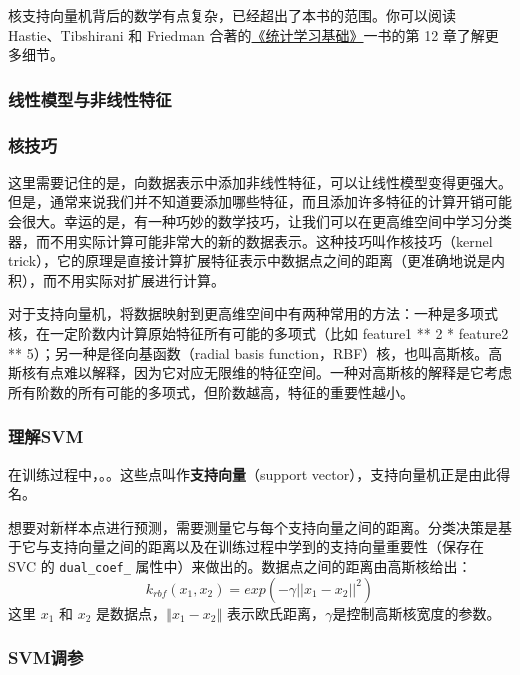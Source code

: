 核支持向量机背后的数学有点复杂，已经超出了本书的范围。你可以阅读 Hastie、Tibshirani 和 Friedman 合著的\href{https://hastie.su.domains/ElemStatLearn/}{《统计学习基础》}一书的第 12 章了解更多细节。
\subsubsection{线性模型与非线性特征}

\subsubsection{核技巧}
这里需要记住的是，向数据表示中添加非线性特征，可以让线性模型变得更强大。但是，通常来说我们并不知道要添加哪些特征，而且添加许多特征的计算开销可能会很大。幸运的是，有一种巧妙的数学技巧，让我们可以在更高维空间中学习分类器，而不用实际计算可能非常大的新的数据表示。这种技巧叫作核技巧（kernel trick），它的原理是直接计算扩展特征表示中数据点之间的距离（更准确地说是内积），而不用实际对扩展进行计算。

对于支持向量机，将数据映射到更高维空间中有两种常用的方法：一种是多项式核，在一定阶数内计算原始特征所有可能的多项式（比如 feature1 ** 2 * feature2 ** 5）；另一种是径向基函数（radial basis function，RBF）核，也叫高斯核。高斯核有点难以解释，因为它对应无限维的特征空间。一种对高斯核的解释是它考虑所有阶数的所有可能的多项式，但阶数越高，特征的重要性越小。

\subsubsection{理解SVM}
在训练过程中，。。这些点叫作\textbf{支持向量}（support vector），支持向量机正是由此得名。

想要对新样本点进行预测，需要测量它与每个支持向量之间的距离。分类决策是基于它与支持向量之间的距离以及在训练过程中学到的支持向量重要性（保存在 SVC 的 \verb|dual_coef_| 属性中）来做出的。数据点之间的距离由高斯核给出：
\begin{equation*}
    k_{rbf}(x_1, x_2)=exp(-\gamma ||x_1-x_2||^2)
\end{equation*}
这里 $x_1$ 和 $x_2$ 是数据点，$‖x_1 - x_2‖$ 表示欧氏距离，$\gamma$是控制高斯核宽度的参数。

\subsubsection{SVM调参}

